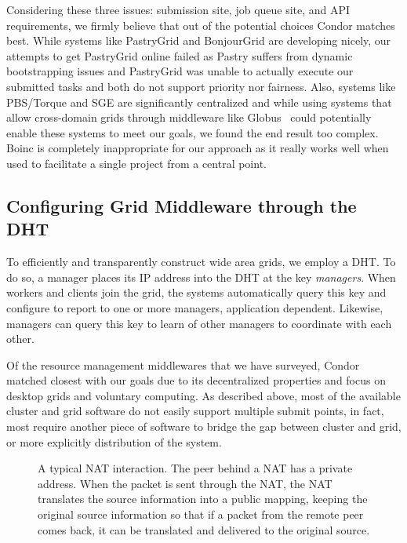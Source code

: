 \documentclass[conference]{IEEEtran}
\begin{document}
\addtocounter{footnote}{1}
\addtocounter{footnote}{1}
\addtocounter{footnote}{1}

Considering these three issues:  submission site, job queue site, and API
requirements, we firmly believe that out of the potential choices Condor
matches best.  While systems like PastryGrid and BonjourGrid are developing
nicely, our attempts to get PastryGrid online failed as Pastry suffers from
dynamic bootstrapping issues and PastryGrid was unable to actually execute our
submitted tasks and both do not support priority nor fairness.  Also, systems
like PBS/Torque and SGE are significantly centralized and while using systems
that allow cross-domain grids through middleware like Globus~\cite{globus}
could potentially enable these systems to meet our goals, we found the end
result too complex.  Boinc is completely inappropriate for our approach as it
really works well when used to facilitate a single project from a central
point.

\subsection{Configuring Grid Middleware through the DHT}
\label{condor}

To efficiently and transparently construct wide area grids, we employ a DHT.
To do so, a manager places its IP address into the DHT at the key
\emph{managers}.  When workers and clients join the grid, the systems
automatically query this key and configure to report to one or more managers,
application dependent.  Likewise, managers can query this key to learn of other
managers to coordinate with each other.

Of the resource management middlewares that we have surveyed, Condor matched
closest with our goals due to its decentralized properties and focus on desktop
grids and voluntary computing.  As described above, most of the available
cluster and grid software do not easily support multiple submit points, in
fact, most require another piece of software to bridge the gap between cluster
and grid, or more explicitly distribution of the system.

\begin{figure}[h!t!]
\centering
{}
\caption{A typical NAT interaction. The peer behind a NAT has a private address.
When the packet is sent through the NAT, the NAT translates the source information
into a public mapping, keeping the original source information so that if a
packet from the remote peer comes back, it can be translated and delivered to
the original source.}
\label{fig:nat}
\end{figure}
\end{document}
